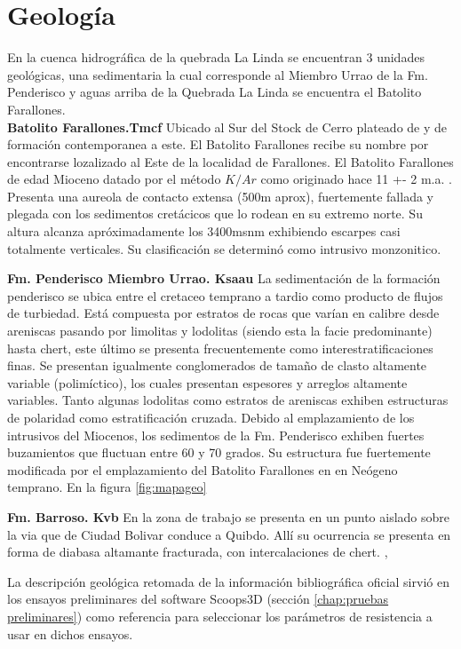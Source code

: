 \section{Geolog\'ia}
En la cuenca hidrogr\'afica de la quebrada La Linda se encuentran 3 unidades geol\'ogicas, una sedimentaria la cual corresponde al Miembro Urrao de la Fm. Penderisco y aguas arriba de la Quebrada La Linda se encuentra el Batolito Farallones.\\

\textbf{Batolito Farallones.Tmcf}
Ubicado al Sur del Stock de Cerro plateado de y de formaci\'on contemporanea a este. El Batolito Farallones recibe su nombre por encontrarse lozalizado al Este de la localidad de Farallones.
El Batolito Farallones de edad Mioceno datado por el m\'etodo $K/Ar$ como originado hace 11 +- 2 m.a. \cite{farallones}. Presenta una aureola de contacto extensa (500m aprox), fuertemente fallada y plegada con los sedimentos cret\'acicos que lo rodean en su extremo norte. Su altura alcanza apr\'oximadamente los 3400msnm exhibiendo escarpes casi totalmente verticales.
Su clasificaci\'on se determin\'o como intrusivo monzonitico.
 

\textbf{Fm. Penderisco Miembro Urrao. Ksaau}
La sedimentaci\'on de la formaci\'on penderisco se ubica entre el cretaceo temprano a tardio como producto de flujos de turbiedad.
Est\'a compuesta por estratos de rocas que var\'ian en calibre desde areniscas pasando por limolitas y lodolitas (siendo esta la facie predominante) hasta chert, este \'ultimo se presenta frecuentemente como interestratificaciones finas. Se presentan igualmente conglomerados de tama\~no de clasto altamente variable (polim\'ictico), los cuales presentan espesores y arreglos altamente variables.
Tanto algunas lodolitas como estratos de areniscas exhiben estructuras de polaridad como estratificaci\'on cruzada.
Debido al emplazamiento de los intrusivos del Miocenos, los sedimentos de la Fm. Penderisco exhiben fuertes buzamientos que fluctuan  entre 60 y 70 grados. \cite{urrao}
Su estructura fue fuertemente modificada por el emplazamiento del Batolito Farallones en en Ne\'ogeno temprano. En la figura \ref{fig:mapageo}

\textbf{Fm. Barroso. Kvb}
En la zona de trabajo se presenta en un punto aislado sobre la via que de Ciudad Bolivar conduce a Quibdo.
All\'i su ocurrencia se presenta en forma de diabasa altamante fracturada, con intercalaciones de chert. \cite{barroso}, 




La descripci\'on geol\'ogica retomada de la informaci\'on bibliogr\'afica oficial sirvi\'o en los ensayos preliminares del software Scoops3D (secci\'on \ref{chap:pruebas preliminares}) como referencia para seleccionar los par\'ametros de resistencia a usar en dichos ensayos.

